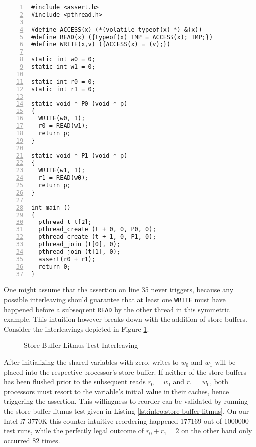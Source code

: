 \begin{lstlisting}[style=c++, numbers=left, numberstyle=\footnotesize, numberblanklines=false, caption={Store Buffer Litmus Test}, label={lst:intro:store-buffer-litmus}]
#include <assert.h>
#include <pthread.h>

#define ACCESS(x) (*(volatile typeof(x) *) &(x))
#define READ(x) ({typeof(x) TMP = ACCESS(x); TMP;})
#define WRITE(x,v) ({ACCESS(x) = (v);})

static int w0 = 0;
static int w1 = 0;

static int r0 = 0;
static int r1 = 0;

static void * P0 (void * p)
{
  WRITE(w0, 1);
  r0 = READ(w1);
  return p;
}

static void * P1 (void * p)
{
  WRITE(w1, 1);
  r1 = READ(w0);
  return p;
}

int main ()
{
  pthread_t t[2];
  pthread_create (t + 0, 0, P0, 0);
  pthread_create (t + 1, 0, P1, 0);
  pthread_join (t[0], 0);
  pthread_join (t[1], 0);
  assert(r0 + r1);
  return 0;
}
\end{lstlisting}

One might assume that the assertion on line 35 never triggers, because any possible interleaving should guarantee that at least one \lstinline[style=c++]{WRITE} must have happened before a subsequent \lstinline[style=c++]{READ} by the other thread in this symmetric example.
This intuition however breaks down with the addition of store buffers.
Consider the interleavings depicted in Figure \ref{fig:intro:store-buffer-litmus-interleaving}.
\begin{figure}[!h]
  \centering
  
  \caption{Store Buffer Litmus Test Interleaving}
  \label{fig:intro:store-buffer-litmus-interleaving}
\end{figure}
After initializing the shared variables with zero, %
writes to $w_0$ and $w_1$ will be placed into the respective processor's store buffer.
If neither of the store buffers has been flushed prior to the subsequent reads $r_0 = w_1$ and $r_1 = w_0$, both processors must resort to the variable's initial value in their caches,
hence triggering the assertion.
This willingness to reorder can be validated by running the store buffer litmus test given in Listing \ref{lst:intro:store-buffer-litmus}.
On our Intel i7-3770K this counter-intuitive reordering happened 177169 out of 1000000 test runs, while the perfectly legal outcome of $r_0 + r_1 = 2$ on the other hand only occurred 82 times.

